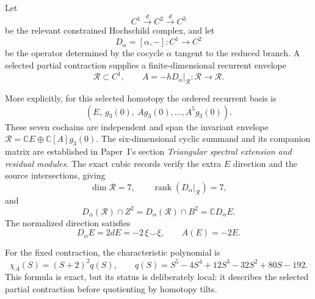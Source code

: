 \documentclass[11pt]{amsart}
\newcommand{\C}{\mathbb C}
\newcommand{\rank}{\operatorname{rank}}
\begin{document}
Let
\[
C^1\xrightarrow{d}C^2\xrightarrow{d}C^3
\]
be the relevant constrained Hochschild complex, and let
\[
D_\alpha=[\alpha,-]:C^1\longrightarrow C^2
\]
be the operator determined by the cocycle \(\alpha\) tangent to the reduced branch.  A selected partial contraction supplies a finite-dimensional recurrent envelope
\[
\mathcal R\subset C^1,
\qquad
A=-hD_\alpha\big|_{\mathcal R}:\mathcal R\longrightarrow\mathcal R.
\]

More explicitly, for this selected homotopy the ordered recurrent basis is
\[
(E,\ g_3(0),\ Ag_3(0),\ldots,A^5g_3(0)).
\]
These seven cochains are independent and span the invariant envelope
$\mathcal R=\C E\oplus\C[A]g_3(0)$. The six-dimensional cyclic summand
and its companion matrix are established in Paper~I's section
\emph{Triangular spectral extension and residual modules}.
The exact cubic records \cite{CubicRecords} verify the extra $E$ direction
and the source intersections, giving
\[
\dim\mathcal R=7,
\qquad
\rank(D_\alpha|_{\mathcal R})=7,
\]
and
\[
D_\alpha(\mathcal R)\cap Z^2
=D_\alpha(\mathcal R)\cap B^2
=\C D_\alpha E.
\]
The normalized direction satisfies
\[
D_\alpha E=2dE=-2\,\xi\smile\xi,
\qquad
A(E)=-2E.
\]

For the fixed contraction, the characteristic polynomial is
\[
\chi_A(S)=(S+2)^2q(S),
\qquad
q(S)=S^5-4S^4+12S^3-32S^2+80S-192.
\]
This formula is exact, but its status is deliberately local: it describes the selected partial contraction before quotienting by homotopy tilts.
\end{document}
